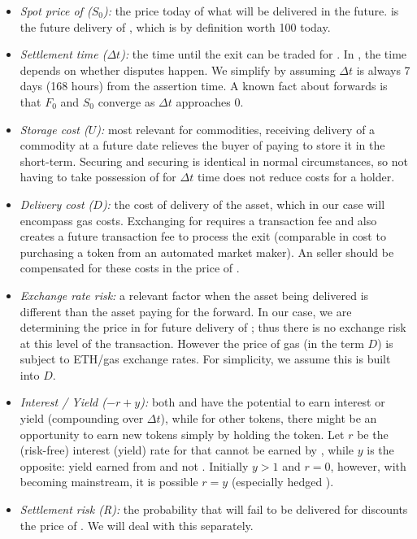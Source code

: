 \begin{itemize}
\item \textit{Spot price of \ethone ($S_0$):} the price today of what will be delivered in the future. \ethxx is the future delivery of \ethone, which is by definition worth 100 \ethone today. 
\item \textit{Settlement time ($\Delta t$):} the time until the exit can be traded for \ethone. In \arb, the time depends on whether disputes happen. We simplify by assuming $\Delta t$ is always 7 days (168 hours) from the assertion time. A known fact about forwards is that $F_0$ and $S_0$ converge as $\Delta t$ approaches 0. 
\item \textit{Storage cost ($U$):} most relevant for commodities, receiving delivery of a commodity at a future date relieves the buyer of paying to store it in the short-term. Securing \ethxx and securing \ethone is identical in normal circumstances, so not having to take possession of \ethone for $\Delta t$ time does not reduce costs for a \ethxx holder. 
\item \textit{Delivery cost ($D$):} the cost of delivery of the asset, which in our case will encompass gas costs. Exchanging \ethone for \ethxx requires a transaction fee and also creates a future transaction fee to process the exit (comparable in cost to purchasing a token from an automated market maker). An \ethone seller should be compensated for these costs in the price of \ethxx.
\item \textit{Exchange rate risk:} a relevant factor when the asset being delivered is different than the asset paying for the forward. In our case, we are determining the price in \ethone for future delivery of \ethone; thus there is no exchange risk at this level of the transaction. However the price of gas (in the term $D$) is subject to ETH/gas exchange rates. For simplicity, we assume this is built into $D$.
\item \textit{Interest / Yield ($-r+y$):} both \ethone and \ethxx have the potential to earn interest or yield (compounding over $\Delta t$), while for other tokens, there might be an opportunity to earn new tokens simply by holding the token. Let $r$ be the (risk-free) interest (yield) rate for \ethone that cannot be earned by \ethxx, while $y$ is the opposite: yield earned from \ethxx and not \ethone. Initially $y>1$ and $r=0$, however, with \ethxx becoming mainstream, it is possible $r=y$ (especially hedged \ethxx). 
\item \textit{Settlement risk (R):} the probability that \ethone will fail to be delivered for \ethxx discounts the price of \ethxx. We will deal with this separately.

\end{itemize}

